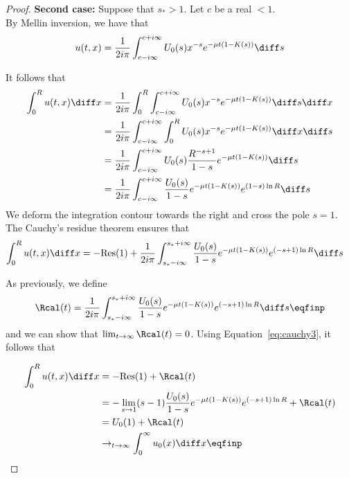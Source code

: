 \begin{proof}
\textbf{Second case:} Suppose that $s_* > 1$. Let $c$ be a real $<1$. \\
By Mellin inversion, we have that
\begin{align*}
    u(t,x) = \frac{1}{2i\pi}\int_{c-i\infty}^{c+i\infty} U_0(s) x^{-s} e^{-\mu t(1 - K(s))} \diff s
\end{align*}

It follows that
\begin{align*}
    \int_0^R u(t,x) \diff x 
    &= \frac{1}{2i\pi} \int_0^R \int_{c-i\infty}^{c+i\infty} U_0(s) x^{-s} e^{-\mu t(1 - K(s))} \diff s \diff x \\
    &= \frac{1}{2i\pi} \int_{c-i\infty}^{c+i\infty} \int_0^R U_0(s) x^{-s} e^{-\mu t(1 - K(s))} \diff x \diff s \\
    &= \frac{1}{2i\pi} \int_{c-i\infty}^{c+i\infty} U_0(s) \frac{R^{-s+1}}{1-s} e^{-\mu t(1 - K(s))} \diff s \\
    &= \frac{1}{2i\pi} \int_{c-i\infty}^{c+i\infty} \frac{U_0(s)}{1-s} e^{-\mu t(1 - K(s))} e^{(1-s)\ln R} \diff s \\
\end{align*}
We deform the integration contour towards the right and cross the pole $s = 1$. The Cauchy's residue theorem ensures that
\begin{align}
    \int_0^R u(t,x) \diff x &= -\mathrm{Res(1)} + \frac{1}{2i\pi} \int_{s_*-i\infty}^{s_*+i\infty} \frac{U_0(s)}{1-s} e^{-\mu t(1 - K(s))} e^{(-s+1)\ln R} \diff s
    \label{eq:cauchy3}
\end{align}

As previously, we define
\begin{align*}
    \Rcal(t) = \frac{1}{2i\pi} \int_{s_*-i\infty}^{s_*+i\infty} \frac{U_0(s)}{1-s} e^{-\mu t(1 - K(s))} e^{(-s+1)\ln R} \diff s
    \eqfinp
\end{align*}
and we can show that $\lim_{t\to\infty}\Rcal(t) = 0$. Using Equation~\ref{eq:cauchy3}, it follows that 

\begin{align*}
    \int_0^R u(t,x) \diff x &= -\mathrm{Res(1)} + \Rcal(t) \\
    &= -\lim_{s \to 1} (s-1)\frac{U_0(s)}{1-s} e^{-\mu t(1 - K(s))} e^{(-s+1)\ln R}  + \Rcal(t)\\
    &= U_0(1) + \Rcal(t)\\
    &\to_{t \to \infty} \int_0^\infty u_0(x) \diff x
    \eqfinp
\end{align*}
\end{proof}


